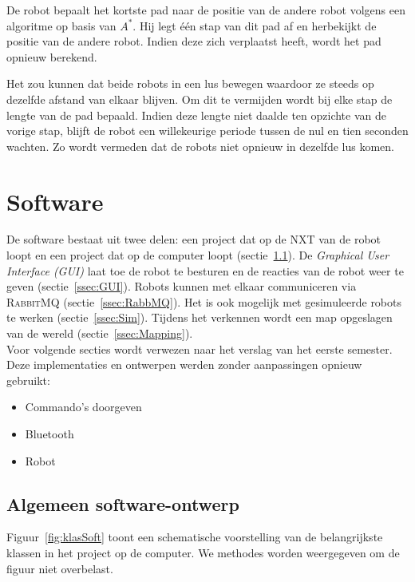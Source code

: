 \documentclass[eind]{penoverslag}
\begin{document}
De robot bepaalt het kortste pad naar de positie van de andere robot volgens een algoritme op basis van $A^{*}$. Hij legt \'e\'en stap van dit pad af en herbekijkt de positie van de andere robot. Indien deze zich verplaatst heeft, wordt het pad opnieuw berekend.

Het zou kunnen dat beide robots in een lus bewegen waardoor ze steeds op dezelfde afstand van elkaar blijven. Om dit te vermijden wordt bij elke stap de lengte van de pad bepaald. Indien deze lengte niet daalde ten opzichte van de vorige stap, blijft de robot een willekeurige periode tussen de nul en tien seconden wachten. Zo wordt vermeden dat de robots niet opnieuw in dezelfde lus komen.


\section{Software}
\label{sec:Softw}
De software bestaat uit twee delen: een project dat op de \textsc{NXT} van de robot loopt en een project dat op de computer loopt (sectie~\ref{ssec:Sdesign}). De \textit{Graphical User Interface (GUI)} laat toe de robot te besturen en de reacties van de robot weer te geven (sectie~\ref{ssec:GUI}). Robots kunnen met elkaar communiceren via \textsc{RabbitMQ} (sectie~\ref{ssec:RabbMQ}). Het is ook mogelijk met gesimuleerde robots te werken (sectie~\ref{ssec:Sim}). Tijdens het verkennen wordt een map opgeslagen van de wereld (sectie~\ref{ssec:Mapping}).\\

Voor volgende secties wordt verwezen naar het verslag van het eerste semester. Deze implementaties en ontwerpen werden zonder aanpassingen opnieuw gebruikt:
\begin{itemize}
\item Commando's doorgeven
\item Bluetooth
\item Robot
\end{itemize}

\subsection{Algemeen software-ontwerp}
\label{ssec:Sdesign}
Figuur~\ref{fig:klasSoft} toont een schematische voorstelling van de belangrijkste klassen in het project op de computer. We methodes worden weergegeven om de figuur niet overbelast.\\
\end{document}
